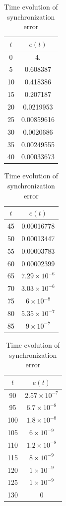 \documentclass[11pt]{article}
\theoremstyle{remark}
\begin{document}
\begin{table}[H]
	\centering
	\caption{Time evolution of synchronization error}
	\label{tab:error}
\begin{tabular}{cc}
	\hline
	$t$ & $e(t)$ \\
	\hline
	0 & 4. \\
	5 & 0.608387 \\
	10 & 0.418386 \\
	15 & 0.207187 \\
	20 & 0.0219953 \\
	25 & 0.00859616 \\
	30 & 0.0020686 \\
	35 & 0.00249555 \\
	40 & 0.00033673 \\
	\hline
\end{tabular}
\hspace{1.5cm}
\begin{tabular}{cc}
	\hline
$t$ & $e(t)$ \\
\hline
	45 & 0.00016778 \\
50 & 0.00013447 \\
55 & 0.00003783 \\
60 & 0.00002399 \\
65 & $7.29\times 10^{-6}$ \\
70 & $3.03\times 10^{-6}$ \\
75 & $6\times 10^{-8}$ \\
80 & $5.35\times 10^{-7}$ \\
	85 & $9\times 10^{-7}$ \\
\hline
\end{tabular}
\hspace{1.5cm}
\begin{tabular}{cc}
	\hline
	$t$ & $e(t)$ \\
	\hline
	
	90 & $2.57\times 10^{-7}$ \\
	95 & $6.7\times 10^{-8}$ \\
	100 & $1.8\times 10^{-8}$ \\
	105 &$ 6\times 10^{-9}$ \\
	110 & $1.2\times 10^{-8}$ \\
	115 & $8\times 10^{-9}$ \\
	120 & $1\times 10^{-9}$  \\
	125& $1\times 10^{-9}$\\
	130&0\\
	\hline
	
\end{tabular}


\end{table}
\end{document}
